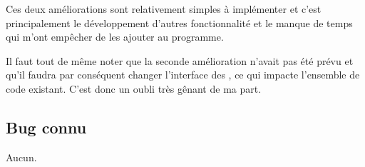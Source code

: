 Ces deux améliorations sont relativement simples à implémenter et c'est
principalement le développement d'autres fonctionnalité et le manque de temps
qui m'ont empêcher de les ajouter au programme. 

Il faut tout de même noter que la seconde amélioration n'avait pas été prévu
et qu'il faudra par conséquent changer l'interface des , ce qui impacte
l'ensemble de code existant.  C'est donc un oubli très gênant de ma part.

\subsection{Bug connu}
Aucun.
